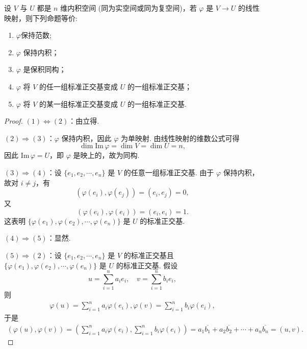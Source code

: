 \documentclass[../../main.tex]{subfiles}%
\begin{document}
\begin{theorem}\label{theorem:保积同构的等价命题}
设 $V$ 与 $U$ 都是 $n$ 维内积空间 (同为实空间或同为复空间)，若 $\varphi$ 是 $V \to U$ 的线性映射，则下列命题等价:
\begin{enumerate}[(1)]
\item $\varphi$保持范数;

\item $\varphi$ 保持内积；

\item  $\varphi$ 是保积同构；

\item  $\varphi$ 将 $V$ 的任一组标准正交基变成 $U$ 的一组标准正交基；

\item $\varphi$ 将 $V$ 的某一组标准正交基变成 $U$ 的一组标准正交基.
\end{enumerate}
\end{theorem}
\begin{proof}

$(1) \Leftrightarrow  (2)$：由立得.

$(2) \Rightarrow (3)$：$\varphi$ 保持内积，因此 $\varphi$ 为单映射. 由线性映射的维数公式可得
\[
\dim \text{Im}\,\varphi = \dim V = \dim U = n,
\]
因此 $\text{Im}\,\varphi = U$，即 $\varphi$ 是映上的，故为同构.

$(3) \Rightarrow (4)$：设 $\{e_1,e_2,\cdots,e_n\}$ 是 $V$ 的任意一组标准正交基. 由于 $\varphi$ 保持内积，故对 $i \neq j$，有
\[
(\varphi(e_i),\varphi(e_j)) = (e_i,e_j) = 0,
\]
又
\[
(\varphi(e_i),\varphi(e_i)) = (e_i,e_i) = 1.
\]
这表明 $\{\varphi(e_1),\varphi(e_2),\cdots,\varphi(e_n)\}$ 是 $U$ 的标准正交基.

$(4) \Rightarrow (5)$：显然.

$(5) \Rightarrow (2)$：设 $\{e_1,e_2,\cdots,e_n\}$ 是 $V$ 的标准正交基且 $\{\varphi(e_1),\varphi(e_2),\cdots,\varphi(e_n)\}$ 是 $U$ 的标准正交基. 假设
\[
u = \sum_{i = 1}^{n}a_ie_i,\quad v = \sum_{i = 1}^{n}b_ie_i,
\]
则
\begin{align*}
\varphi (u)=\sum_{i=1}^n{a_i\varphi (e_i),\varphi (v)=\sum_{i=1}^n{b_i\varphi (e_i),}}
\end{align*}
于是
\begin{align*}
(\varphi (u),\varphi (v))=\left( \sum_{i=1}^n{a_i\varphi (e_i),\sum_{i=1}^n{b_i\varphi (e_i)}} \right) =a_1\overline{b_1}+a_2\overline{b_2}+\cdots +a_n\overline{b_n}=(u,v).
\end{align*}

\end{proof}
\end{document}
